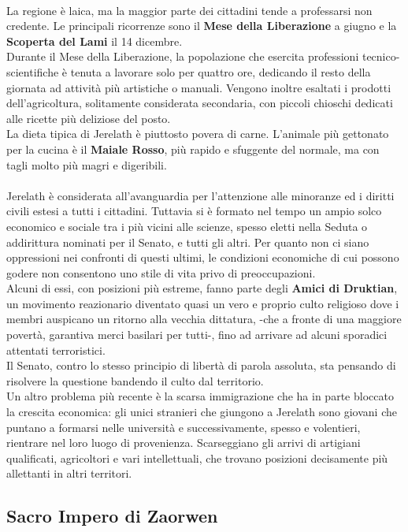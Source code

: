 \documentclass[a4paper]{scrreprt}
\begin{document}
\\
La regione è laica, ma la maggior parte dei cittadini tende a professarsi non credente. Le principali ricorrenze sono il \textbf{Mese della Liberazione} a giugno e la \textbf{Scoperta del Lami} il 14 dicembre.\\
Durante il Mese della Liberazione, la popolazione che esercita professioni tecnico-scientifiche è tenuta a lavorare solo per quattro ore, dedicando il resto della giornata ad attività più artistiche o manuali. Vengono inoltre esaltati i prodotti dell'agricoltura, solitamente considerata secondaria, con piccoli chioschi dedicati alle ricette più deliziose del posto.\\
La dieta tipica di Jerelath è piuttosto povera di carne. L'animale più gettonato per la cucina è il \textbf{Maiale Rosso}, più rapido e sfuggente del normale, ma con tagli molto più magri e digeribili.\\
\\
Jerelath è considerata all'avanguardia per l'attenzione alle minoranze ed i diritti civili estesi a tutti i cittadini. Tuttavia si è formato nel tempo un ampio solco economico e sociale tra i più vicini alle scienze, spesso eletti nella Seduta o addirittura nominati per il Senato, e tutti gli altri. Per quanto non ci siano oppressioni nei confronti di questi ultimi, le condizioni economiche di cui possono godere non consentono uno stile di vita privo di preoccupazioni.\\
Alcuni di essi, con posizioni più estreme, fanno parte degli \textbf{Amici di Druktian}, un movimento reazionario diventato quasi un vero e proprio culto religioso dove i membri auspicano un ritorno alla vecchia dittatura, -che a fronte di una maggiore povertà, garantiva merci basilari per tutti-, fino ad arrivare ad alcuni sporadici attentati terroristici.\\
Il Senato, contro lo stesso principio di libertà di parola assoluta, sta pensando di risolvere la questione bandendo il culto dal territorio.\\
Un altro problema più recente è la scarsa immigrazione che ha in parte bloccato la crescita economica: gli unici stranieri che giungono a Jerelath sono giovani che puntano a formarsi nelle università e successivamente, spesso e volentieri, rientrare nel loro luogo di provenienza. Scarseggiano gli arrivi di artigiani qualificati, agricoltori e vari intellettuali, che trovano posizioni decisamente più allettanti in altri territori.  

\subsection{Sacro Impero di Zaorwen}
\end{document}
